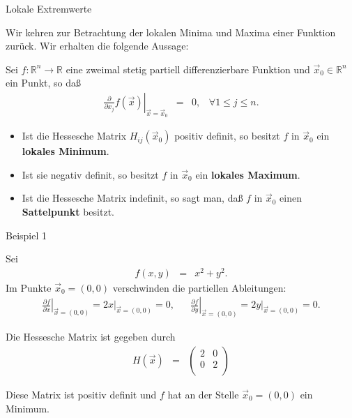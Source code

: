 \documentclass[german]{beamer}
\newcommand{\bq}{\begin{eqnarray*}}
\newcommand{\eq}{\end{eqnarray*}}
\begin{document}
\begin{frame}{Lokale Extremwerte}

Wir kehren zur Betrachtung der lokalen Minima und Maxima einer Funktion zur\"uck. Wir erhalten die
folgende Aussage:

\begin{theorem}
Sei $f : {\mathbb R}^n \rightarrow {\mathbb R}$ eine zweimal stetig partiell differenzierbare Funktion
und $\vec{x}_0\in {\mathbb R}^n$ ein Punkt, so da{\ss}
\bq
 \left. \frac{\partial}{\partial x_j} f(\vec{x}) \right|_{\vec{x}=\vec{x}_0} & = & 0,
 \;\;\; \forall 1 \le j \le n.
\eq
\begin{itemize}
\item Ist die Hessesche Matrix $H_{ij}(\vec{x}_0)$ positiv definit, so besitzt $f$ in $\vec{x}_0$
ein {\bf lokales Minimum}.
\item Ist sie negativ definit, so besitzt $f$ in $\vec{x}_0$ ein {\bf lokales Maximum}.
\item Ist die Hessesche Matrix indefinit, so sagt man, da{\ss} $f$ in $\vec{x}_0$ einen {\bf Sattelpunkt}
besitzt.
\end{itemize}
\end{theorem}

\end{frame}

\begin{frame}{Beispiel 1}

\begin{example}
Sei 
\bq
 f(x,y) & = & x^2 + y^2.
\eq
Im Punkte $\vec{x}_0=(0,0)$ verschwinden die partiellen Ableitungen:
{\footnotesize
\bq
 \left.\frac{\partial f}{\partial x}\right|_{\vec{x}=(0,0)}
 = \left. 2 x \right|_{\vec{x}=(0,0)}
 = 0,
 & &
 \left.\frac{\partial f}{\partial y}\right|_{\vec{x}=(0,0)}
 = \left. 2 y \right|_{\vec{x}=(0,0)}
 = 0.
\eq
}

\vspace*{-2mm}
Die Hessesche Matrix ist gegeben durch
{\footnotesize
\bq
 H(\vec{x}) & = & \left( \begin{array}{cc}
  2 & 0 \\
  0 & 2 \\
 \end{array} \right)
\eq
}

\vspace*{-2mm}
Diese Matrix ist positiv definit und $f$ hat an der Stelle $\vec{x}_0=(0,0)$ ein Minimum.
\end{example}

\end{frame}
\end{document}
